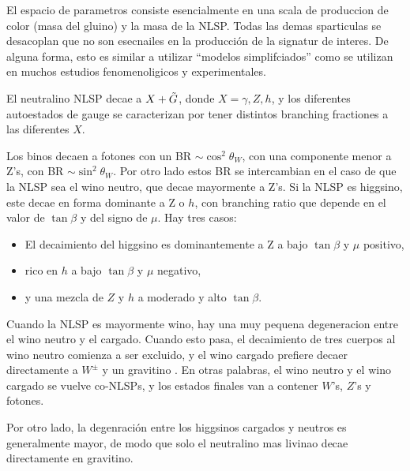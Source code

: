 
El espacio de parametros consiste esencialmente en una scala de produccion de color (masa del gluino)
y la masa de la NLSP. Todas las demas sparticulas se desacoplan que no son esecnailes en la producción
de la signatur de interes. De alguna forma, esto es similar a utilizar ``modelos simplifciados'' como
se utilizan en muchos estudios fenomenoligicos y experimentales. 


El neutralino NLSP decae a $X + \tilde{G}$, donde $X=\gamma, Z, h$, y los diferentes autoestados de gauge
se caracterizan por tener distintos branching fractiones a las diferentes $X$.


Los binos decaen a fotones con un BR $\sim \cos^2\theta_W$, con una componente menor a Z's, con
BR $\sim \sin^2\theta_W$.
Por otro lado estos BR se intercambian en el caso de que la NLSP sea el wino neutro, que decae
mayormente a Z's.
Si la NLSP es higgsino, este decae en forma dominante a Z o $h$, con branching ratio que depende
en el valor de $\tan\beta$ y del signo de $\mu$. Hay tres casos:

\begin{itemize}
\item El decaimiento del higgsino es dominantemente a Z a bajo $\tan\beta$ y $\mu$ positivo,
\item rico en $h$ a bajo $\tan\beta$ y $\mu$ negativo,
\item y una mezcla de $Z$ y $h$ a moderado y alto $\tan\beta$.
\end{itemize}

Cuando la NLSP es mayormente wino, hay una muy pequena degeneracion entre el wino neutro y el
cargado. Cuando esto pasa, el decaimiento de tres cuerpos al wino neutro comienza
a ser excluido, y el wino cargado prefiere decaer directamente a $W^{\pm}$ y un gravitino .
En otras palabras, el wino neutro y el wino cargado se vuelve co-NLSPs, y los estados finales van
a contener $W$'s, $Z$'s y fotones.

Por otro lado, la degenraci\'on entre los higgsinos cargados y neutros es generalmente mayor, de modo
que solo el neutralino mas livinao decae directamente en gravitino.

